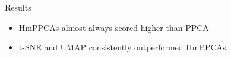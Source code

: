 \documentclass{beamer}
\begin{document}
\begin{frame}{Results}
\begin{itemize}
    \item HmPPCAs almost always scored higher than PPCA
    \item t-SNE and UMAP consistently outperformed HmPPCAs
\end{itemize}
\end{frame}


    
    

    
    
\end{document}
